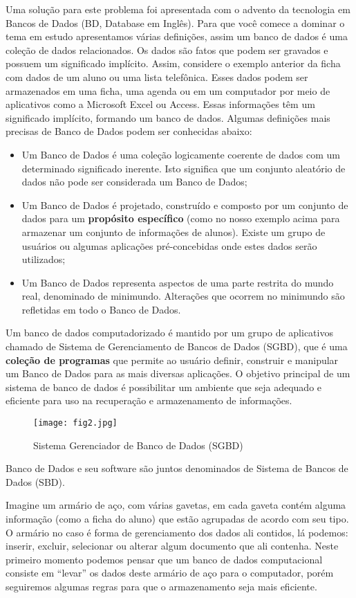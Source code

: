 \documentclass{article}
\begin{document}
Uma solução para este problema foi apresentada com o advento da tecnologia em Bancos de Dados (BD, Database em Inglês). Para que você comece a dominar o tema em estudo apresentamos várias definições, assim um banco de dados é uma coleção de dados relacionados. Os dados são fatos que podem ser gravados e possuem um significado implícito. Assim, considere o exemplo anterior da ficha com dados de um aluno ou uma lista telefônica. Esses dados podem ser armazenados em uma ficha, uma agenda ou em um computador por meio de aplicativos como a Microsoft Excel ou Access. Essas informações têm um significado implícito, formando um banco de dados. Algumas definições mais precisas de Banco de Dados podem ser conhecidas abaixo:
\begin{itemize}
    \item Um Banco de Dados é uma coleção logicamente coerente de dados com um determinado significado inerente. Isto significa que um conjunto aleatório de dados não pode ser considerada um Banco de Dados;
    \item Um Banco de Dados é projetado, construído e composto por um conjunto de dados para um \textbf{propósito específico} (como no nosso exemplo acima para armazenar um conjunto de informações de alunos). Existe um grupo de usuários ou algumas aplicações pré-concebidas onde estes dados serão utilizados;
    \item Um Banco de Dados representa aspectos de uma parte restrita do mundo real, denominado de minimundo. Alterações que ocorrem no minimundo são refletidas em todo o Banco de Dados.
\end{itemize}

Um banco de dados computadorizado é mantido por um grupo de aplicativos chamado de Sistema de Gerenciamento de Bancos de Dados (SGBD), que é uma \textbf{coleção de programas} que permite ao usuário definir, construir e manipular um Banco de Dados para as mais diversas aplicações. O objetivo principal de um sistema de banco de dados é possibilitar um ambiente que seja adequado e eficiente para uso na recuperação e armazenamento de informações.
\begin{figure}[h]
    \centering
    \texttt{[image: fig2.jpg]}
    \caption{Sistema Gerenciador de Banco de Dados (SGBD)}
    \label{fig:fig2}
\end{figure}

Banco de Dados e seu software são juntos denominados de Sistema de Bancos de Dados (SBD).

Imagine um armário de aço, com várias gavetas, em cada gaveta contém alguma informação (como a ficha do aluno) que estão agrupadas de acordo com seu tipo. O armário no caso é forma de gerenciamento dos dados ali contidos, lá podemos: inserir, excluir, selecionar ou alterar algum documento que ali contenha. Neste primeiro momento podemos pensar que um banco de dados computacional consiste em “levar” os dados deste armário de aço para o computador, porém seguiremos algumas regras para que o armazenamento seja mais eficiente.
\end{document}

